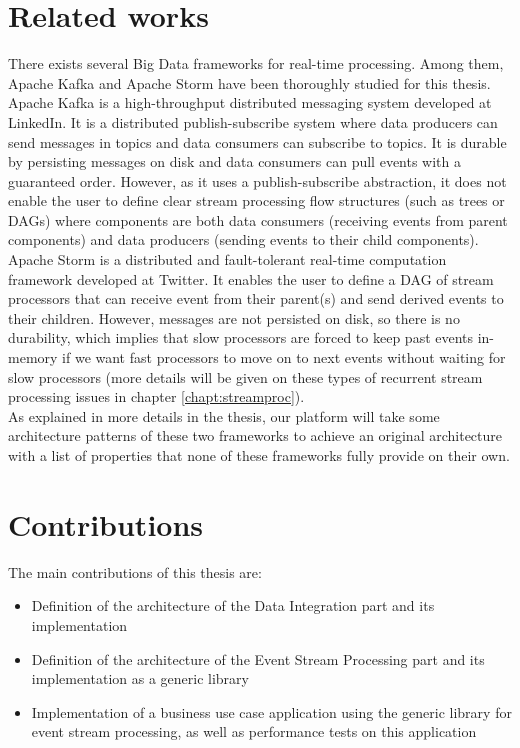 \section{Related works}

There exists several Big Data frameworks for real-time processing. Among them, Apache Kafka  and Apache Storm  have been thoroughly studied for this thesis.
\\

Apache Kafka is a high-throughput distributed messaging system developed at LinkedIn. It is a distributed publish-subscribe system where data producers can send messages in topics and data consumers can subscribe to topics. It is durable by persisting messages on disk and data consumers can pull events with a guaranteed order. However, as it uses a publish-subscribe abstraction, it does not enable the user to define clear stream processing flow structures (such as trees or DAGs) where components are both data consumers (receiving events from parent components) and data producers (sending events to their child components).
\\

Apache Storm is a distributed and fault-tolerant real-time computation framework developed at Twitter. It enables the user to define a DAG of stream processors that can receive event from their parent(s) and send derived events to their children. However, messages are not persisted on disk, so there is no durability, which implies that slow processors are forced to keep past events in-memory if we want fast processors to move on to next events without waiting for slow processors (more details will be given on these types of recurrent stream processing issues in chapter \ref{chapt:streamproc}).
\\

As explained in more details in the thesis, our platform will take some architecture patterns of these two frameworks to achieve an original architecture with a list of properties that none of these frameworks fully provide on their own.

\section{Contributions}

The main contributions of this thesis are:
\begin{itemize}
  \item Definition of the architecture of the Data Integration part and its implementation
  \item Definition of the architecture of the Event Stream Processing part and its implementation as a generic library
  \item Implementation of a business use case application using the generic library for event stream processing, as well as performance tests on this application
\end{itemize}




